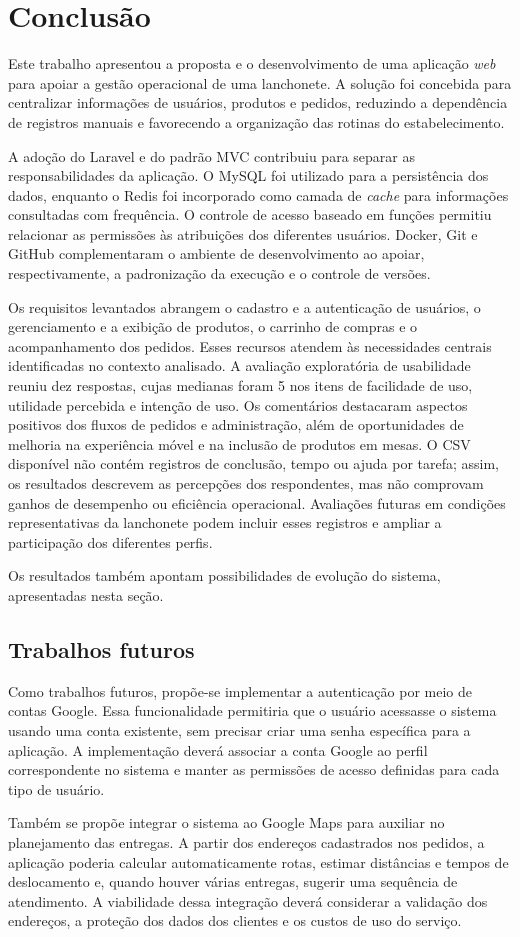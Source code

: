 \chapter[Conclusão]{Conclusão}

Este trabalho apresentou a proposta e o desenvolvimento de uma aplicação \textit{web} para apoiar a gestão operacional de uma lanchonete. A solução foi concebida para centralizar informações de usuários, produtos e pedidos, reduzindo a dependência de registros manuais e favorecendo a organização das rotinas do estabelecimento.

A adoção do Laravel e do padrão MVC contribuiu para separar as responsabilidades da aplicação. O MySQL foi utilizado para a persistência dos dados, enquanto o Redis foi incorporado como camada de \textit{cache} para informações consultadas com frequência. O controle de acesso baseado em funções permitiu relacionar as permissões às atribuições dos diferentes usuários. Docker, Git e GitHub complementaram o ambiente de desenvolvimento ao apoiar, respectivamente, a padronização da execução e o controle de versões.

Os requisitos levantados abrangem o cadastro e a autenticação de usuários, o gerenciamento e a exibição de produtos, o carrinho de compras e o acompanhamento dos pedidos. Esses recursos atendem às necessidades centrais identificadas no contexto analisado. A avaliação exploratória de usabilidade reuniu dez respostas, cujas medianas foram 5 nos itens de facilidade de uso, utilidade percebida e intenção de uso. Os comentários destacaram aspectos positivos dos fluxos de pedidos e administração, além de oportunidades de melhoria na experiência móvel e na inclusão de produtos em mesas. O CSV disponível não contém registros de conclusão, tempo ou ajuda por tarefa; assim, os resultados descrevem as percepções dos respondentes, mas não comprovam ganhos de desempenho ou eficiência operacional. Avaliações futuras em condições representativas da lanchonete podem incluir esses registros e ampliar a participação dos diferentes perfis.

Os resultados também apontam possibilidades de evolução do sistema, apresentadas nesta seção.

\section{Trabalhos futuros}

Como trabalhos futuros, propõe-se implementar a autenticação por meio de contas Google. Essa funcionalidade permitiria que o usuário acessasse o sistema usando uma conta existente, sem precisar criar uma senha específica para a aplicação. A implementação deverá associar a conta Google ao perfil correspondente no sistema e manter as permissões de acesso definidas para cada tipo de usuário.

Também se propõe integrar o sistema ao Google Maps para auxiliar no planejamento das entregas. A partir dos endereços cadastrados nos pedidos, a aplicação poderia calcular automaticamente rotas, estimar distâncias e tempos de deslocamento e, quando houver várias entregas, sugerir uma sequência de atendimento. A viabilidade dessa integração deverá considerar a validação dos endereços, a proteção dos dados dos clientes e os custos de uso do serviço.
